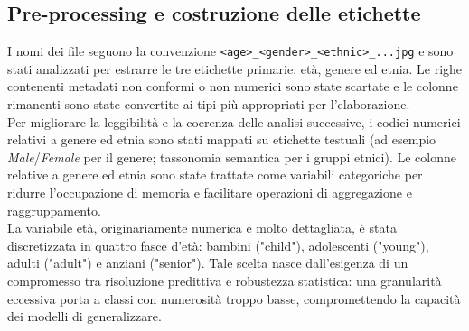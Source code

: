 \documentclass[a4paper,12pt]{report}
\begin{document}
	\subsection{Pre-processing e costruzione delle etichette}
	
	I nomi dei file seguono la convenzione \texttt{<age>\_<gender>\_<ethnic>\_...jpg} e sono stati analizzati per estrarre le tre etichette primarie: età, genere ed etnia. Le righe contenenti metadati non conformi o non numerici sono state scartate e le colonne rimanenti sono state convertite ai tipi più appropriati per l'elaborazione. \\
	Per migliorare la leggibilità e la coerenza delle analisi successive, i codici numerici relativi a genere ed etnia sono stati mappati su etichette testuali (ad esempio \textit{Male}/\textit{Female} per il genere; tassonomia semantica per i gruppi etnici). Le colonne relative a genere ed etnia sono state trattate come variabili categoriche per ridurre l'occupazione di memoria e facilitare operazioni di aggregazione e raggruppamento. \\
	La variabile età, originariamente numerica e molto dettagliata, è stata discretizzata in quattro fasce d'età: bambini ("child"), adolescenti ("young"), adulti ("adult") e anziani ("senior"). Tale scelta nasce dall'esigenza di un compromesso tra risoluzione predittiva e robustezza statistica: una granularità eccessiva porta a classi con numerosità troppo basse, compromettendo la capacità dei modelli di generalizzare.
	
\end{document}
